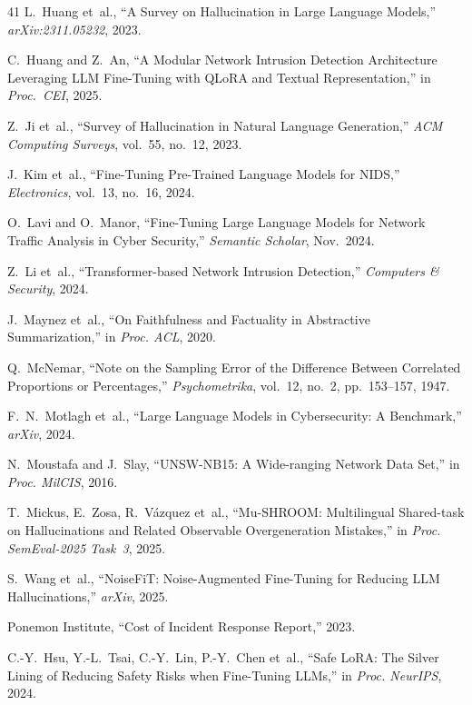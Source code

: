 \documentclass[journal]{IEEEtran}
\begin{document}
\begin{thebibliography}{41}
L.~Huang et~al., ``A Survey on Hallucination in Large Language Models,'' \emph{arXiv:2311.05232}, 2023.

C.~Huang and Z.~An, ``A Modular Network Intrusion Detection Architecture Leveraging LLM Fine-Tuning with QLoRA and Textual Representation,'' in \emph{Proc.\ CEI}, 2025.

Z.~Ji et~al., ``Survey of Hallucination in Natural Language Generation,'' \emph{ACM Computing Surveys}, vol.~55, no.~12, 2023.

J.~Kim et~al., ``Fine-Tuning Pre-Trained Language Models for NIDS,'' \emph{Electronics}, vol.~13, no.~16, 2024.

O.~Lavi and O.~Manor, ``Fine-Tuning Large Language Models for Network Traffic Analysis in Cyber Security,'' \emph{Semantic Scholar}, Nov.\ 2024.

Z.~Li et~al., ``Transformer-based Network Intrusion Detection,'' \emph{Computers \& Security}, 2024.

J.~Maynez et~al., ``On Faithfulness and Factuality in Abstractive Summarization,'' in \emph{Proc. ACL}, 2020.

Q.~McNemar, ``Note on the Sampling Error of the Difference Between Correlated Proportions or Percentages,'' \emph{Psychometrika}, vol.~12, no.~2, pp.~153--157, 1947.

F.~N.~Motlagh et~al., ``Large Language Models in Cybersecurity: A Benchmark,'' \emph{arXiv}, 2024.

N.~Moustafa and J.~Slay, ``UNSW-NB15: A Wide-ranging Network Data Set,'' in \emph{Proc. MilCIS}, 2016.

T.~Mickus, E.~Zosa, R.~V\'{a}zquez et~al., ``Mu-SHROOM: Multilingual Shared-task on Hallucinations and Related Observable Overgeneration Mistakes,'' in \emph{Proc. SemEval-2025 Task~3}, 2025.

S.~Wang et~al., ``NoiseFiT: Noise-Augmented Fine-Tuning for Reducing LLM Hallucinations,'' \emph{arXiv}, 2025.

Ponemon Institute, ``Cost of Incident Response Report,'' 2023.

C.-Y.~Hsu, Y.-L.~Tsai, C.-Y.~Lin, P.-Y.~Chen et~al., ``Safe LoRA: The Silver Lining of Reducing Safety Risks when Fine-Tuning LLMs,'' in \emph{Proc. NeurIPS}, 2024.


\end{thebibliography}
\end{document}
